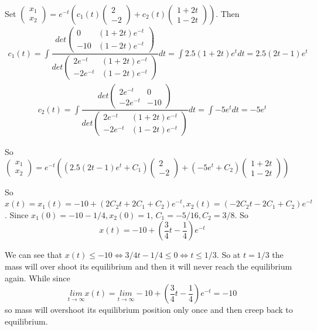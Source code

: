 \documentclass[a4paper,12pt,titlepage]{article}
\begin{document}
Set $\begin{pmatrix}
x_1\\
x_2
\end{pmatrix}=e^{-t}(c_1(t)\begin{pmatrix}
2\\
-2
\end{pmatrix}+c_2(t)\begin{pmatrix}
1+2t\\
1-2t
\end{pmatrix})$. Then 
\begin{align*}
c_1(t)=\int\dfrac{det\begin{pmatrix}
0&(1+2t)e^{-t}\\
-10&(1-2t)e^{-t}
\end{pmatrix}}{det\begin{pmatrix}
2e^{-t}&(1+2t)e^{-t}\\
-2e^{-t}&(1-2t)e^{-t}
\end{pmatrix}}dt=\int 2.5(1+2t)e^tdt=2.5(2t-1)e^t
\end{align*}
\begin{align*}
c_2(t)=\int\dfrac{det\begin{pmatrix}
2e^{-t}&0\\
-2e^{-t}&-10
\end{pmatrix}}{det\begin{pmatrix}
2e^{-t}&(1+2t)e^{-t}\\
-2e^{-t}&(1-2t)e^{-t}
\end{pmatrix}}dt=\int -5e^tdt=-5e^t
\end{align*}

So  $\begin{pmatrix}
x_1\\
x_2
\end{pmatrix}=e^{-t}((2.5(2t-1)e^t+C_1)\begin{pmatrix}
2\\
-2
\end{pmatrix}+(-5e^t+C_2)\begin{pmatrix}
1+2t\\
1-2t
\end{pmatrix})
$

So $x(t)=x_1(t)=-10+(2C_2t+2C_1+C_2)e^{-t},x_2(t)=(-2C_2t-2C_1+C_2)e^{-t}$. Since $x_1(0)=-10-1/4,x_2(0)=1$, $C_1=-5/16,C_2=3/8$. So
$$x(t)=-10+(\dfrac{3}{4}t-\dfrac{1}{4})e^{-t}$$

 We can see that $x(t)\leqslant -10 \Leftrightarrow 3/4t-1/4\leqslant 0\Leftrightarrow t\leqslant1/3$. So at $t=1/3$ the mass will over shoot its equilibrium and then it will never reach the equilibrium again. While since
 $$\underset{t\rightarrow\infty}{lim}x(t)=\underset{t\rightarrow\infty}{lim}-10+(\dfrac{3}{4}t-\dfrac{1}{4})e^{-t}=-10$$
so mass will overshoot its equilibrium position only once and then creep back to equilibrium.   
\end{document}
